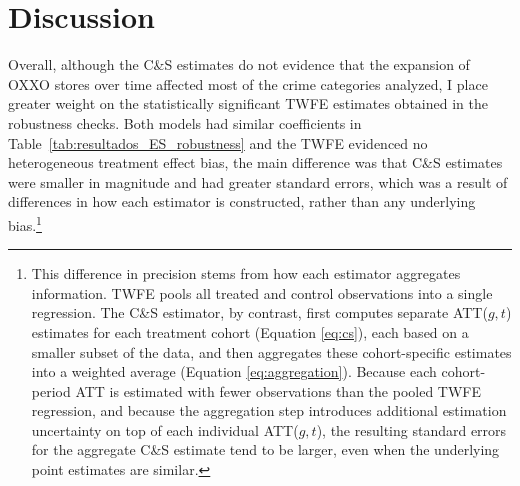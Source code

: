 \documentclass[12pt]{article}
\begin{document}
\section{Discussion}
\label{sec:Discussion}

Overall, although the C\&S estimates do not evidence that the expansion of OXXO stores over time affected most of the crime categories analyzed, I place greater weight on the statistically significant TWFE estimates obtained in the robustness checks. Both models had similar coefficients in Table~\ref{tab:resultados_ES_robustness} and the TWFE evidenced no heterogeneous treatment effect bias, the main difference was that C\&S estimates were smaller in magnitude and had greater standard errors, which was a result of differences in how each estimator is constructed, rather than any underlying bias.\footnote{This difference in precision stems from how each estimator aggregates information. TWFE pools all treated and control observations into a single regression. The C\&S estimator, by contrast, first computes separate ATT($g,t$) estimates for each treatment cohort (Equation \ref{eq:cs}), each based on a smaller subset of the data, and then aggregates these cohort-specific estimates into a weighted average (Equation \ref{eq:aggregation}). Because each cohort-period ATT is estimated with fewer observations than the pooled TWFE regression, and because the aggregation step introduces additional estimation uncertainty on top of each individual ATT($g,t$), the resulting standard errors for the aggregate C\&S estimate tend to be larger, even when the underlying point estimates are similar.}\\
\end{document}
